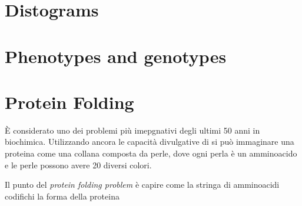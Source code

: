 \section{Distograms}

\section{Phenotypes and genotypes}

\section{Protein Folding}
È considerato uno dei problemi più imepgnativi degli ultimi 50 anni in biochimica.
Utilizzando ancora le capacità divulgative di \cite{TalksDill2013Oct} si può immaginare una proteina come una collana composta da perle, dove ogni perla è un amminoacido e le perle possono avere 20 diversi colori.

Il punto del \textit{protein folding problem }è capire come la stringa di amminoacidi codifichi la forma della proteina

\clearpage